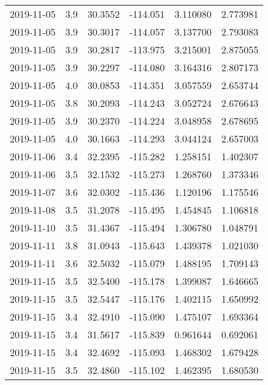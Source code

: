 \begin{tabular}{lrrrrr}
2019-11-05 &       3.9 &  30.3552 &  -114.051 &         3.110080 &         2.773981 \\
2019-11-05 &       3.9 &  30.3017 &  -114.057 &         3.137700 &         2.793083 \\
2019-11-05 &       3.9 &  30.2817 &  -113.975 &         3.215001 &         2.875055 \\
2019-11-05 &       3.9 &  30.2297 &  -114.080 &         3.164316 &         2.807173 \\
2019-11-05 &       4.0 &  30.0853 &  -114.351 &         3.057559 &         2.653744 \\
2019-11-05 &       3.8 &  30.2093 &  -114.243 &         3.052724 &         2.676643 \\
2019-11-05 &       3.9 &  30.2370 &  -114.224 &         3.048958 &         2.678695 \\
2019-11-05 &       4.0 &  30.1663 &  -114.293 &         3.044124 &         2.657003 \\
2019-11-06 &       3.4 &  32.2395 &  -115.282 &         1.258151 &         1.402307 \\
2019-11-06 &       3.5 &  32.1532 &  -115.273 &         1.268760 &         1.373346 \\
2019-11-07 &       3.6 &  32.0302 &  -115.436 &         1.120196 &         1.175546 \\
2019-11-08 &       3.5 &  31.2078 &  -115.495 &         1.454845 &         1.106818 \\
2019-11-10 &       3.5 &  31.4367 &  -115.494 &         1.306780 &         1.048791 \\
2019-11-11 &       3.8 &  31.0943 &  -115.643 &         1.439378 &         1.021030 \\
2019-11-11 &       3.6 &  32.5032 &  -115.079 &         1.488195 &         1.709143 \\
2019-11-15 &       3.5 &  32.5400 &  -115.178 &         1.399087 &         1.646665 \\
2019-11-15 &       3.5 &  32.5447 &  -115.176 &         1.402115 &         1.650992 \\
2019-11-15 &       3.4 &  32.4910 &  -115.090 &         1.475107 &         1.693364 \\
2019-11-15 &       3.4 &  31.5617 &  -115.839 &         0.961644 &         0.692061 \\
2019-11-15 &       3.4 &  32.4692 &  -115.093 &         1.468302 &         1.679428 \\
2019-11-15 &       3.5 &  32.4860 &  -115.102 &         1.462395 &         1.680530 \\

\end{tabular}

